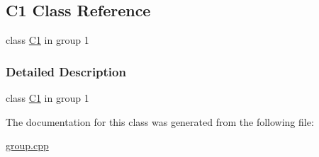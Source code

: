 \hypertarget{class_c1}{}\subsection{C1 Class Reference}
\label{class_c1}


class \hyperlink{class_c1}{C1} in group 1  




\subsubsection{Detailed Description}
class \hyperlink{class_c1}{C1} in group 1 

The documentation for this class was generated from the following file\+:\begin{DoxyCompactItemize}
\item 
\hyperlink{group_8cpp}{group.\+cpp}\end{DoxyCompactItemize}
